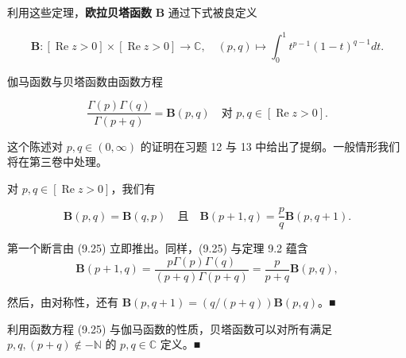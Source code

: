 利用这些定理，\textbf{欧拉贝塔函数} $ \mathbf{B} $ 通过下式被良定义

\[
\mathbf{B} : [\operatorname{Re} z > 0] \times [\operatorname{Re} z > 0] \to \mathbb{C} , \quad (p, q) \mapsto \int_{0}^{1} t^{p-1} (1-t)^{q-1} dt .
\]

\begin{remark}

\begin{items}
\item

伽马函数与贝塔函数由函数方程

\begin{equation}
\frac{\Gamma(p)\Gamma(q)}{\Gamma(p+q)} = \mathbf{B}(p, q) \quad \text{对 } p, q \in [\operatorname{Re} z > 0] .\tag{9.25}
\end{equation}

这个陈述对 $ p, q \in (0, \infty) $ 的证明在习题 12 与 13 中给出了提纲。一般情形我们将在第三卷中处理。

\item

对 $ p, q \in [\operatorname{Re} z > 0] $，我们有

\[
\mathbf{B}(p, q) = \mathbf{B}(q, p) \quad \text{且} \quad \mathbf{B}(p+1, q) = \frac{p}{q} \mathbf{B}(p, q+1) .
\]

\proofhead
第一个断言由 (9.25) 立即推出。同样，(9.25) 与定理 9.2 蕴含
\[
\mathbf{B}(p+1, q) = \frac{p\Gamma(p)\Gamma(q)}{(p+q)\Gamma(p+q)} = \frac{p}{p+q} \mathbf{B}(p, q) ,
\]

然后，由对称性，还有 $ \mathbf{B}(p, q+1) = (q/(p+q))\mathbf{B}(p, q) $。\nobreak\hspace{0.35em}■

\item

利用函数方程 (9.25) 与伽马函数的性质，贝塔函数可以对所有满足 $ p, q, (p+q) \notin -\mathbb{N} $ 的 $ p, q \in \mathbb{C} $ 定义。\nobreak\hspace{0.35em}■

\end{items}

\end{remark}

\exerciseshead

